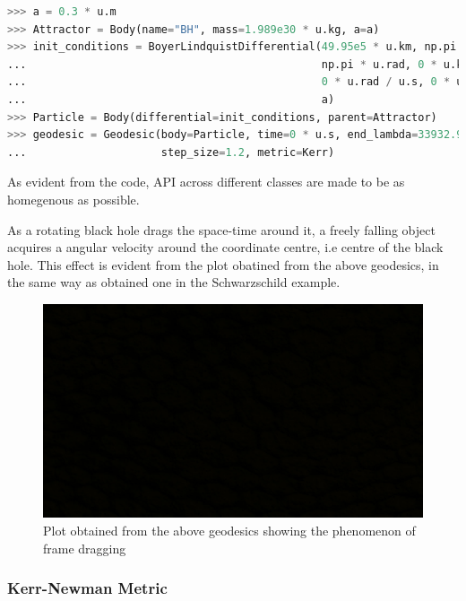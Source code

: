 \documentclass{aastex63}
\begin{document}
\begin{lstlisting}[language=Python, caption=Defining the Kerr Body and the particle and calculating geodesics]
>>> a = 0.3 * u.m
>>> Attractor = Body(name="BH", mass=1.989e30 * u.kg, a=a)
>>> init_conditions = BoyerLindquistDifferential(49.95e5 * u.km, np.pi / 2 * u.rad, 
...                                              np.pi * u.rad, 0 * u.km / u.s, 
...                                              0 * u.rad / u.s, 0 * u.rad / u.s,
...                                              a)
>>> Particle = Body(differential=init_conditions, parent=Attractor)
>>> geodesic = Geodesic(body=Particle, time=0 * u.s, end_lambda=33932.90,
...                     step_size=1.2, metric=Kerr)
\end{lstlisting}

As evident from the code, API across different classes are made to be as homegenous as possible.

As a rotating black hole drags the space-time around it, a freely falling object acquires a angular velocity around the coordinate centre, i.e centre of the black hole. This effect is evident from the plot obatined from the above geodesics, in the same way as obtained one in the Schwarzschild example.

\begin{figure}[h]
	\centering
	\includegraphics[scale=0.1]{images/blank.jpg} %
	\caption{Plot obtained from the above geodesics showing the phenomenon of frame dragging}
	\label{fig:kerr}
\end{figure}


\subsubsection{Kerr-Newman Metric}
\end{document}
